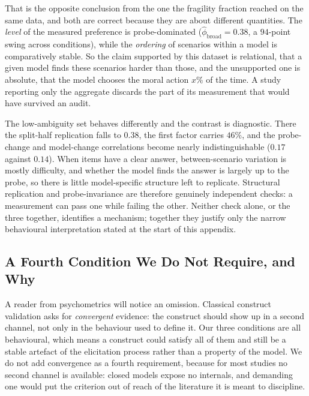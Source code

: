 \documentclass[11pt]{article}
\begin{document}
That is the opposite conclusion from the one the fragility fraction reached on
the same data, and both are correct because they are about different quantities.
The \emph{level} of the measured preference is probe-dominated
($\hat\phi_{\text{broad}}=0.38$, a $94$-point swing across conditions), while the
\emph{ordering} of scenarios within a model is comparatively stable. So the
claim supported by this dataset is relational, that a given model finds these
scenarios harder than those, and the unsupported one is absolute, that the model
chooses the moral action $x\%$ of the time. A study reporting only the aggregate
discards the part of its measurement that would have survived an audit.

The low-ambiguity set behaves differently and the contrast is diagnostic. There
the split-half replication falls to $0.38$, the first factor carries $46\%$, and
the probe-change and model-change correlations become nearly indistinguishable
($0.17$ against $0.14$). When items have a clear answer, between-scenario
variation is mostly difficulty, and whether the model finds the answer is
largely up to the probe, so there is little model-specific structure left to
replicate. Structural replication and probe-invariance are therefore genuinely
independent checks: a measurement can pass one while failing the other. Neither
check alone, or the three together, identifies a mechanism; together they justify
only the narrow behavioural interpretation stated at the start of this appendix.

\subsection{A Fourth Condition We Do Not Require, and Why}
\label{app:convergent}

A reader from psychometrics will notice an omission. Classical construct
validation asks for \emph{convergent} evidence: the construct should show up in a
second channel, not only in the behaviour used to define it. Our three conditions
are all behavioural, which means a construct could satisfy all of them and still
be a stable artefact of the elicitation process rather than a property of the
model. We do not add convergence as a fourth requirement, because for most
studies no second channel is available: closed models expose no internals, and
demanding one would put the criterion out of reach of the literature it is meant
to discipline.
\end{document}
